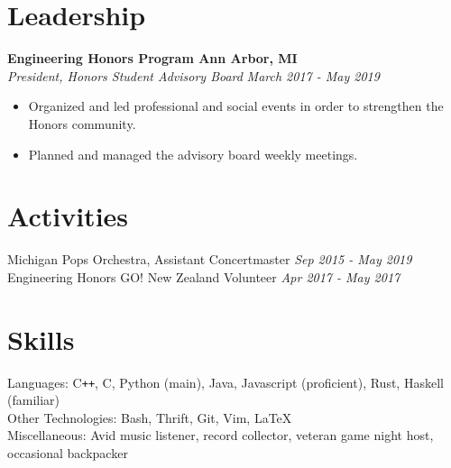 \documentclass[margin,line]{resume}
\begin{document}
\begin{resume}
	\vspace{2.5mm}
	
	\sectionbreak
	\section{\mysidestyle Leadership}
	\textbf{Engineering Honors Program \hfill Ann Arbor, MI} \vspace{1mm}\\\vspace{1mm}%
	\textsl{President, Honors Student Advisory Board} \hfill \textsl{March 2017 - May 2019}
	\begin{itemize}[leftmargin=4mm]
		\item Organized and led professional and social events in order to strengthen the Honors community.
		\item Planned and managed the advisory board weekly meetings.
	\end{itemize}
	
	\vspace{2.5mm}
	
	\sectionbreak
	\section{\mysidestyle Activities}
	\begin{flushright}
		\vspace{-7.5mm}
		Michigan Pops Orchestra, Assistant Concertmaster  \hfill \textsl{Sep 2015 - May 2019}\\
		Engineering Honors GO! New Zealand Volunteer \hfill \textsl{Apr 2017 - May 2017} \\
	\end{flushright}
	\vspace{-1.5mm}
	    
	\sectionbreak
	\section{\mysidestyle Skills}
	Languages: C\texttt{++}, C, Python (main), Java, Javascript (proficient), Rust, Haskell (familiar) \\ %
	Other Technologies: Bash, Thrift, Git, Vim, \LaTeX \\
	Miscellaneous:  Avid music listener, record collector, veteran game night host, occasional backpacker
\end{resume}
\end{document}
